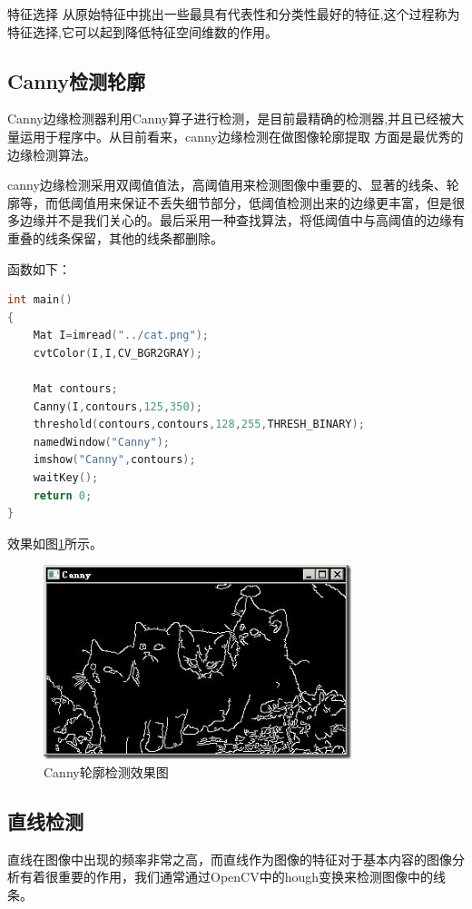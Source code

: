 \documentclass{XDBAthesis}
\begin{document}
     特征选择  从原始特征中挑出一些最具有代表性和分类性最好的特征,这个过程称为特征选择,它可以起到降低特征空间维数的作用。

\subsection{Canny检测轮廓}

Canny边缘检测器利用Canny算子进行检测，是目前最精确的检测器,并且已经被大量运用于程序中。从目前看来，canny边缘检测在做图像轮廓提取 方面是最优秀的边缘检测算法。

canny边缘检测采用双阈值值法，高阈值用来检测图像中重要的、显著的线条、轮廓等，而低阈值用来保证不丢失细节部分，低阈值检测出来的边缘更丰富，但是很多边缘并不是我们关心的。最后采用一种查找算法，将低阈值中与高阈值的边缘有重叠的线条保留，其他的线条都删除。

函数如下：
\begin{lstlisting}[language=C]
int main() 
{ 
    Mat I=imread("../cat.png"); 
    cvtColor(I,I,CV_BGR2GRAY); 
                                                 
    Mat contours; 
    Canny(I,contours,125,350); 
    threshold(contours,contours,128,255,THRESH_BINARY); 
    namedWindow("Canny"); 
    imshow("Canny",contours); 
    waitKey(); 
    return 0; 
} 
\end{lstlisting}
效果如图\ref{fg:Canny}所示。
\begin{figure}[htb]
    \centering
    \includegraphics[width=0.8\textwidth ]{figure/cat}
    \caption{Canny轮廓检测效果图}
    \label{fg:Canny}
\end{figure}


\subsection{直线检测}

直线在图像中出现的频率非常之高，而直线作为图像的特征对于基本内容的图像分析有着很重要的作用，我们通常通过OpenCV中的hough变换来检测图像中的线条。
\end{document}
